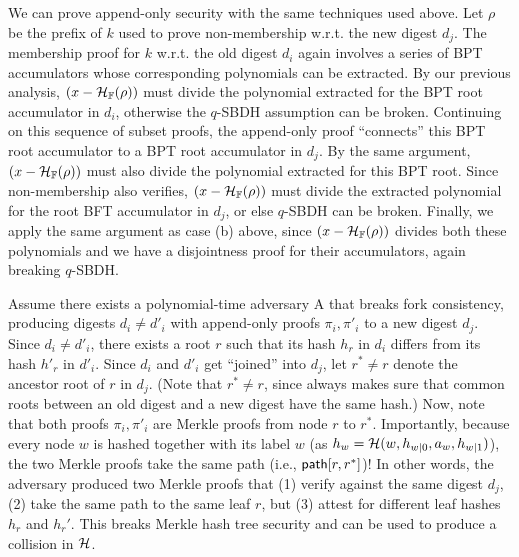 \label{s:aas:proofs:append-only-security}
We can prove append-only security with the same techniques used above. 
Let $\rho$ be the prefix of $k$ used to prove non-membership w.r.t. the new digest $d_{j}$.
The membership proof for $k$ w.r.t. the old digest $d_i$ again involves a series of BPT accumulators whose corresponding polynomials can be extracted.
By our previous analysis, $(x-\mathcal{H}_{\mathbb{F}}(\rho))$ must divide the polynomial extracted for the BPT root accumulator in $d_i$, otherwise the $q$-SBDH assumption can be broken.
Continuing on this sequence of subset proofs, the append-only proof ``connects'' this BPT root accumulator to a BPT root accumulator in $d_{j}$.
By the same argument, $(x-\mathcal{H}_{\mathbb{F}}(\rho))$ must also divide the polynomial extracted for this BPT root.
Since non-membership also verifies, $(x-\mathcal{H}_{\mathbb{F}}(\rho))$ must divide the extracted polynomial for the root BFT accumulator in $d_{j}$, or else $q$-SBDH can be broken.
Finally, we apply the same argument as case (b) above, since $(x-\mathcal{H}_{\mathbb{F}}(\rho))$ divides both these polynomials and we have a disjointness proof for their accumulators, again breaking $q$-SBDH.

\label{s:aas:proofs:fork-consistency}
Assume there exists a polynomial-time adversary \textsf{A} that breaks fork consistency, producing digests $d_i\ne d'_i$ with append-only proofs $\pi_i,\pi'_i$ to a new digest $d_j$.
Since $d_i\ne d'_i$, there exists a root $r$ such that its hash $h_r$ in $d_i$ differs from its hash $h'_r$ in $d'_i$. %
Since $d_i$ and $d'_i$ get ``joined'' into $d_j$, let $r^*\neq r$ denote the ancestor root of $r$ in $d_j$.
(Note that $r^* \neq r$, since \verappendonly always makes sure that common roots between an old digest and a new digest have the same hash.) 
Now, note that both proofs $\pi_i,\pi'_i$ are Merkle proofs from node $r$ to $r^*$.
Importantly, because every node $w$ is hashed together with its label $w$ (as $h_w = \mathcal{H}(w,h_{w|0},a_w,h_{w|1})$), the two Merkle proofs take the same path (i.e., $\mathsf{path}[r,r^*]$)!
In other words, the adversary produced two Merkle proofs that (1) verify against the same digest $d_j$, (2) take the same path to the same leaf $r$, but (3) attest for different leaf hashes $h_r$ and $h_r'$.
This breaks Merkle hash tree security and can be used to produce a collision in $\mathcal{H}$.

\endgroup
